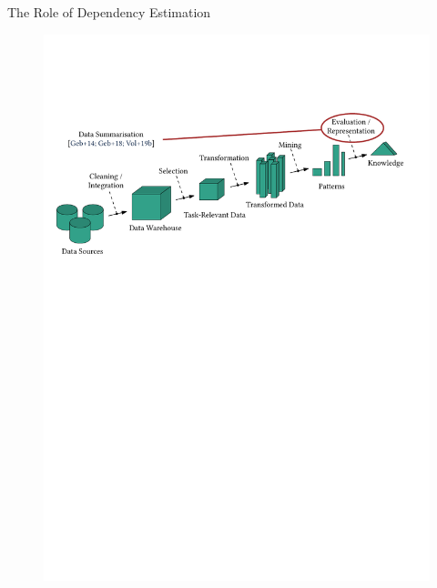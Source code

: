 \documentclass[16pt,usenames,dvipsnames, notheorems]{beamer}
\theoremstyle{definition}
\theoremstyle{example}
\theoremstyle{plain}
\begin{document}
\begin{frame}{The Role of Dependency Estimation}
\begin{figure}
\begin{overprint}
		 \includegraphics[width=0.98\linewidth]{figures/kdd_r5-compressed.pdf}

\end{overprint}
\end{figure}
\end{frame}
\end{document}
